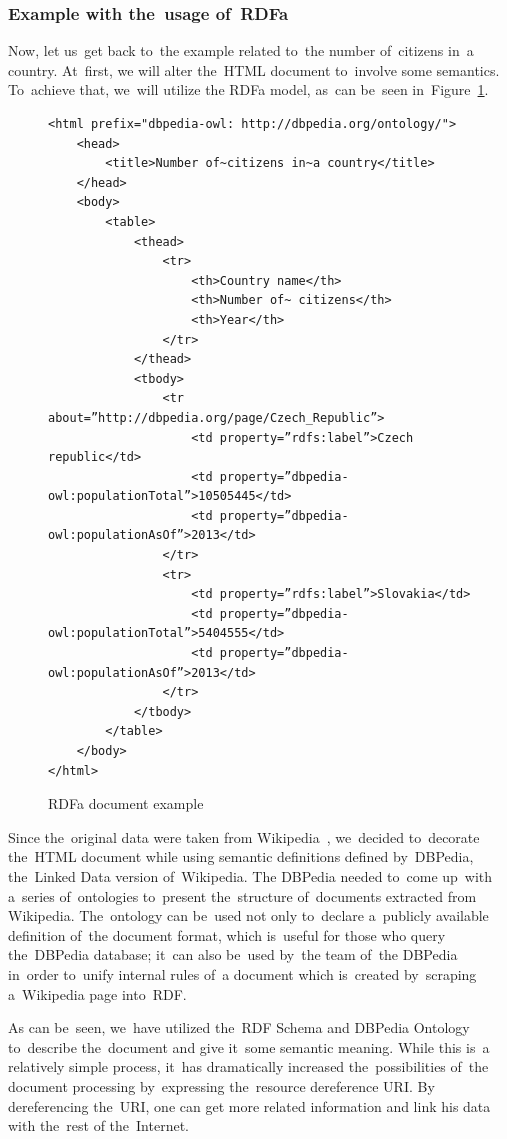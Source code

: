 \subsubsection{Example with the~usage of~RDFa}

Now, let us~get back to~the example related to~the number of~citizens in~a country. At~first, we
will alter the~HTML document to~involve some semantics. To~achieve that, we~will utilize the
RDFa model, as~can be~seen in~Figure~\ref{fig:example-rdfa}.

\begin{figure}
\scriptsize\begin{verbatim}
<html prefix="dbpedia-owl: http://dbpedia.org/ontology/">
    <head>
        <title>Number of~citizens in~a country</title>
    </head>
    <body>
        <table>
            <thead>
                <tr>
                    <th>Country name</th>
                    <th>Number of~ citizens</th>
                    <th>Year</th>
                </tr>
            </thead>
            <tbody>
                <tr about=”http://dbpedia.org/page/Czech_Republic”>
                    <td property=”rdfs:label”>Czech republic</td>
                    <td property=”dbpedia-owl:populationTotal”>10505445</td>
                    <td property=”dbpedia-owl:populationAsOf”>2013</td>
                </tr>
                <tr>
                    <td property=”rdfs:label”>Slovakia</td>
                    <td property=”dbpedia-owl:populationTotal”>5404555</td>
                    <td property=”dbpedia-owl:populationAsOf”>2013</td>
                </tr>
            </tbody>
        </table>
    </body>
</html>
\end{verbatim}\normalsize
\caption{RDFa document example}
\label{fig:example-rdfa}
\end{figure}

Since the~original data were taken from Wikipedia~\cite{wikipedia}, we~decided to~decorate the~HTML document
while using semantic definitions defined by~DBPedia, the~Linked Data version of~Wikipedia. 
The DBPedia needed to~come up~with a~series of~ontologies to~present the~structure of~documents
extracted from Wikipedia. The~ontology can be~used not only to~declare a~publicly available definition of~the document format, which is~useful for those who query the~DBPedia database; it~can also be~used by~the team of~the DBPedia in~order to~unify internal rules of~a document which is~created by~scraping a~Wikipedia page into~RDF.

As can be~seen, we~have utilized the~RDF Schema and DBPedia Ontology to~describe the~document
and give it~some semantic meaning. While this is~a relatively simple process, it~has dramatically
increased the~possibilities of~the document processing by~expressing the~resource dereference URI.
By dereferencing the~URI, one can get more related information and link his data with the~rest
of the~Internet.

